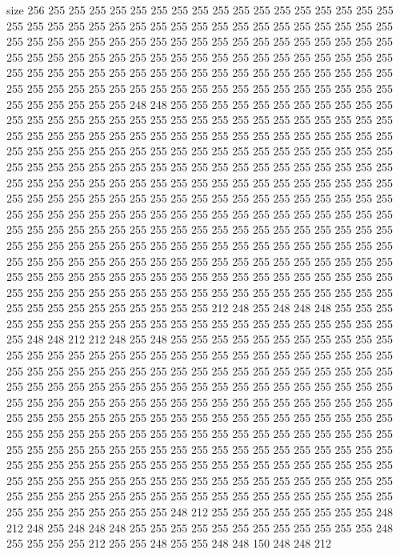size 256
255 255 255 255 255 255 255 255 255 255 255 255 255 255 255 255 255 255 255 255
255 255 255 255 255 255 255 255 255 255 255 255 255 255 255 255 255 255 255 255
255 255 255 255 255 255 255 255 255 255 255 255 255 255 255 255 255 255 255 255
255 255 255 255 255 255 255 255 255 255 255 255 255 255 255 255 255 255 255 255
255 255 255 255 255 255 255 255 255 255 255 255 255 255 255 255 255 255 255 255
255 255 255 255 255 255 255 255 255 255 255 255 255 255 255 255 255 255 248 248
255 255 255 255 255 255 255 255 255 255 255 255 255 255 255 255 255 255 255 255
255 255 255 255 255 255 255 255 255 255 255 255 255 255 255 255 255 255 255 255
255 255 255 255 255 255 255 255 255 255 255 255 255 255 255 255 255 255 255 255
255 255 255 255 255 255 255 255 255 255 255 255 255 255 255 255 255 255 255 255
255 255 255 255 255 255 255 255 255 255 255 255 255 255 255 255 255 255 255 255
255 255 255 255 255 255 255 255 255 255 255 255 255 255 255 255 255 255 255 255
255 255 255 255 255 255 255 255 255 255 255 255 255 255 255 255 255 255 255 255
255 255 255 255 255 255 255 255 255 255 255 255 255 255 255 255 255 255 255 255
255 255 255 255 255 255 255 255 255 255 255 255 255 255 255 255 255 255 255 255
255 255 255 255 255 255 255 255 255 255 255 255 255 255 255 255 255 255 255 255
255 255 255 255 255 255 255 255 255 255 255 255 255 255 255 255 255 255 255 255
255 255 255 255 255 255 255 255 255 255 255 255 255 255 255 255 255 255 255 255
255 255 255 255 255 255 255 255 255 212 248 255 248 248 248 255 255 255 255 255
255 255 255 255 255 255 255 255 255 255 255 255 255 255 255 255 255 255 248 248
212 212 248 255 248 255 255 255 255 255 255 255 255 255 255 255 255 255 255 255
255 255 255 255 255 255 255 255 255 255 255 255 255 255 255 255 255 255 255 255
255 255 255 255 255 255 255 255 255 255 255 255 255 255 255 255 255 255 255 255
255 255 255 255 255 255 255 255 255 255 255 255 255 255 255 255 255 255 255 255
255 255 255 255 255 255 255 255 255 255 255 255 255 255 255 255 255 255 255 255
255 255 255 255 255 255 255 255 255 255 255 255 255 255 255 255 255 255 255 255
255 255 255 255 255 255 255 255 255 255 255 255 255 255 255 255 255 255 255 255
255 255 255 255 255 255 255 255 255 255 255 255 255 255 255 255 255 255 255 255
255 255 255 255 255 255 255 255 255 255 255 255 255 255 255 255 255 255 255 255
255 255 255 255 255 255 255 255 255 255 255 255 255 255 255 255 255 255 255 255
255 255 255 255 255 255 255 255 255 255 255 255 255 255 248 212 255 255 255 255
255 255 255 255 248 212 248 255 248 248 248 255 255 255 255 255 255 255 255 255
255 255 255 248 255 255 255 255 212 255 255 248 255 255 248 248 150 248 248 212
